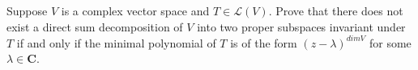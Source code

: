\documentclass[12pt,letterpaper,boxed]{hmcpset}
\begin{document}
\begin{solution}
\end{solution}

\clearpage

\begin{problem}[8]
Suppose $V$ is a complex vector space and $T \in \mathcal{L}(V)$. Prove that there does not exist a direct sum decomposition of $V$ into two proper subspaces invariant under $T$ if and only if the minimal polynomial of $T$ is of the form $(z-\lambda)^{dim V}$ for some $\lambda \in \textbf{C} $.  
\end{problem}

\begin{solution}

\end{solution}
\end{document}
